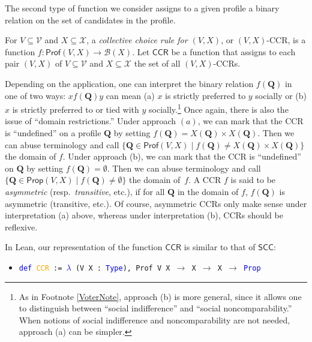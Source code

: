 \documentclass[runningheads]{llncs}
\begin{document}
The second type of function we consider assigns to a given profile a binary relation on the set of candidates in the profile. %

\begin{definition}\textnormal{For $V\subseteq\mathcal{V}$ and $X\subseteq\mathcal{X}$, a \textit{collective choice rule for $(V,X)$}, or $(V,X)$-CCR, is a function  $f: \mathsf{Prof}(V,X)\to \mathcal{B}(X)$. Let $\mathsf{CCR}$ be a function that assigns to each pair $(V,X)$ of $V\subseteq\mathcal{V}$ and $X\subseteq\mathcal{X}$ the set of all $(V,X)$-CCRs.}\end{definition}

\noindent Depending on the application, one can interpret the binary relation $f(\mathbf{Q})$ in one of two ways: $xf(\mathbf{Q})y$ can mean (a) $x$ is strictly preferred to $y$ socially or (b) $x$ is strictly preferred to or tied with $y$ socially.\footnote{As in Footnote \ref{VoterNote}, approach (b) is more general, since it allows one to distinguish between ``social indifference'' and ``social noncomparability.'' When notions of social indifference and noncomparability are not needed, approach (a) can be simpler.} Once again, there is also the issue of ``domain restrictions.'' Under approach $(a)$, we can mark that the CCR is ``undefined'' on a profile $\mathbf{Q}$ by setting $f(\mathbf{Q})= X(\mathbf{Q})\times X(\mathbf{Q})$. Then we can abuse terminology and call $\{\mathbf{Q}\in\mathsf{Prof}(V,X)\mid f(\mathbf{Q})\neq X(\mathbf{Q})\times X(\mathbf{Q}) \}$ the domain of $f$. Under approach (b), we can mark that the CCR is ``undefined'' on $\mathbf{Q}$ by setting $f(\mathbf{Q})=\emptyset$. Then we can abuse terminology and call $\{\mathbf{Q}\in\mathsf{Prop}(V,X)\mid f(\mathbf{Q})\neq \emptyset\}$ the domain of~$f$.  A CCR $f$ is said to be \textit{asymmetric} (resp.~\textit{transitive}, etc.), if for all $\mathbf{Q}$ in the domain of $f$, $f(\mathbf{Q})$ is asymmetric (transitive, etc.). Of course, asymmetric CCRs only make sense under interpretation (a) above, whereas under interpretation (b), CCRs should be reflexive.

In Lean, our representation of the function $\mathsf{CCR}$ is similar to that of $\mathsf{SCC}$:
\begin{itemize}
\item[] \texttt{\textcolor{blue}{def} \textcolor{orange}{CCR} := \textcolor{blue}{$\lambda$} (V X : \textcolor{blue}{Type}), Prof V X $\to$ X $\to$ X $\to$ \textcolor{blue}{Prop}}
\end{itemize}
\end{document}
